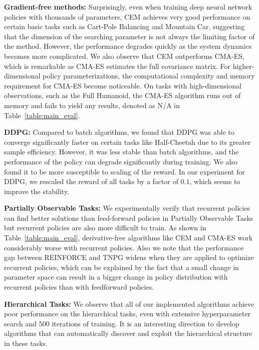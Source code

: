 \documentclass{article}
\begin{document}
{\bf Gradient-free methods:} Surprisingly, even when training deep neural network policies with thousands of parameters, CEM achieves very good performance on certain basic tasks such as Cart-Pole Balancing and Mountain Car, suggesting that the dimension of the searching parameter is not always the limiting factor of the method. However, the performance degrades quickly as the system dynamics becomes more complicated. We also observe that CEM outperforms CMA-ES, which is remarkable as CMA-ES estimates the full covariance matrix. For higher-dimensional policy parameterizations, the computational complexity and memory requirement for CMA-ES become noticeable. On tasks with high-dimensional observations, such as the Full Humanoid, the CMA-ES algorithm runs out of memory and fails to yield any results, denoted as N/A in Table~\ref{table:main_eval}.

{\bf DDPG:} Compared to batch algorithms, we found that DDPG was able to converge significantly faster on certain tasks like Half-Cheetah due to its greater sample efficiency. However, it was less stable than batch algorithms, and the performance of the policy can degrade significantly during training. We also found it to be more susceptible to scaling of the reward. In our experiment for DDPG, we rescaled the reward of all tasks by a factor of $0.1$, which seems to improve the stability.




{\bf Partially Observable Tasks:} We experimentally verify that recurrent policies can find better solutions than feed-forward policies in Partially Observable Tasks but recurrent policies are also more difficult to train. As shown in Table~\ref{table:main_eval}, derivative-free algorithms like CEM and CMA-ES work considerably worse with recurrent policies. Also we note that the performance gap between REINFORCE and TNPG widens when they are applied to optimize recurrent policies, which can be explained by the fact that a small change in parameter space can result in a bigger change in policy distribution with recurrent policies than with feedforward policies.

{\bf Hierarchical Tasks:} We observe that all of our implemented algorithms achieve poor performance on the hierarchical tasks, even with extensive hyperparameter search and $500$ iterations of training. It is an interesting direction to develop algorithms that can automatically discover and exploit the hierarchical structure in these tasks.
\end{document}
